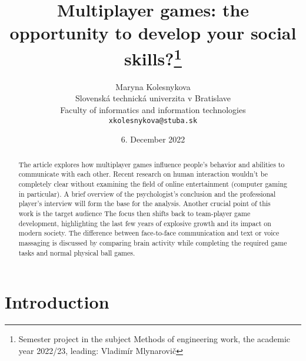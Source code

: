 \documentclass[10pt,twoside,slovak,a4paper]{article}
\title{Multiplayer games: the opportunity to develop your social skills?\thanks{Semester project in the subject Methods of engineering work, the academic year 2022/23, leading: Vladimír Mlynarovič}}
\author{Maryna Kolesnykova\\[2pt]
	{\small Slovenská technická univerzita v Bratislave}\\
	{\small Faculty of informatics and information technologies}\\
	{\small \texttt{xkolesnykova@stuba.sk}}
	}
\date{\small 6. December 2022}
\begin{document}
\maketitle

\begin{abstract}

The article explores how multiplayer games influence people’s behavior and abilities to communicate with each other. Recent research on human interaction wouldn’t be completely clear without examining the field of online entertainment (computer gaming in particular). A brief overview of the psychologist’s conclusion and the professional player’s interview will form the base for the analysis. Another crucial point of this work is the target audience The focus then shifts back to team-player game development, highlighting the last few years of explosive growth and its impact on modern society. The difference between face-to-face communication and text or voice massaging is discussed by comparing brain activity while completing the required game tasks and normal physical ball games.
\end{abstract}



\section{Introduction}
\end{document}
